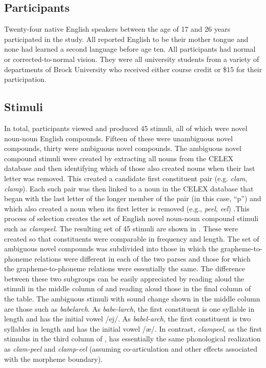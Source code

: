 \documentclass[output=paper]{langsci/langscibook}
\begin{document}
\subsection{Participants}\label{sec:libben:2.1}

Twenty-four native English speakers between the age of 17 and 26 years participated in the study.  All reported English to be their mother tongue and none had learned a second language before age ten.  All participants had normal or corrected-to-normal vision. They were all university students from a variety of departments of Brock University who received either course credit or \$15 for their participation.

\subsection{Stimuli}\label{sec:libben:2.2}
In total, participants viewed and produced 45 stimuli, all of which were novel  noun-noun English compounds. Fifteen of these were unambiguous novel compounds, thirty were ambiguous novel compounds. The ambiguous novel compound stimuli were created by extracting all nouns from the CELEX database \citep{BaayenGulikers1995} and then identifying which of those also created nouns when their last letter was removed. This created a candidate first constituent pair (e.g. \textit{clam}, \textit{clamp}). Each such pair was then linked to a noun in the CELEX database that began with the last letter of the longer member of the pair (in this case, “p”) and which also created a noun when its first letter is removed (e.g., \textit{peel}, \textit{eel}) .This process of selection creates the set of English novel noun-noun compound stimuli such as \textit{clampeel}.  The resulting set of 45 stimuli are shown in .  These were created so that constituents were comparable in frequency and length. The set of ambiguous novel compounds was subdivided into those in which the grapheme-to-phoneme relations were different in each of the two parses and those for which the grapheme-to-phoneme relations were essentially the same. The difference between these two subgroups can be easily appreciated by reading aloud the stimuli in the middle column of  and reading aloud those in the final column of the table. The ambiguous stimuli with sound change shown in the middle column are those such as \textit{babelarch}. As \textit{babe-larch}, the first constituent is one syllable in length and has the initial vowel /ej/. As \textit{babel-arch}, the first constituent is two syllables in length and has the initial vowel /æ/.  In contrast, \textit{clampeel}, as the first stimulus in the third column of , has essentially the same phonological realization as \textit{clam-peel} and \textit{clamp-eel} (assuming co-articulation and other effects associated with the morpheme boundary).
\end{document}
